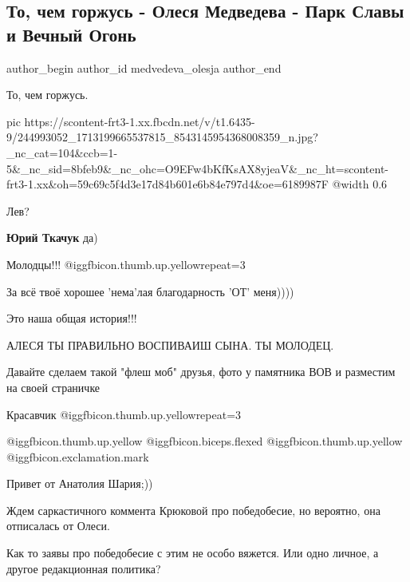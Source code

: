  
 
 
 
 
 
\subsection{То, чем горжусь - Олеся Медведева - Парк Славы и Вечный Огонь}
\label{sec:09_10_2021.fb.medvedeva_olesja.1.park_slavy}
 
\ifcmt
 author_begin
   author_id medvedeva_olesja
 author_end
\fi

То, чем горжусь.

\ifcmt
  pic https://scontent-frt3-1.xx.fbcdn.net/v/t1.6435-9/244993052_1713199665537815_8543145954368008359_n.jpg?_nc_cat=104&ccb=1-5&_nc_sid=8bfeb9&_nc_ohc=O9EFw4bKfKsAX8yjeaV&_nc_ht=scontent-frt3-1.xx&oh=59c69c5f4d3e17d84b601e6b84e797d4&oe=6189987F
  @width 0.6
\fi

\begin{itemize} %
Лев?

\textbf{Юрий Ткачук} да)

Молодцы!!! @igg{fbicon.thumb.up.yellow}{repeat=3} 

За всё твоё хорошее 'нема'лая благодарность 'ОТ' меня))))

Это наша общая история!!!

АЛЕСЯ ТЫ ПРАВИЛЬНО ВОСПИВАИШ СЫНА. ТЫ МОЛОДЕЦ.

Давайте сделаем такой "флеш моб" друзья, фото у памятника ВОВ и разместим на своей страничке

Красавчик  @igg{fbicon.thumb.up.yellow}{repeat=3} 

 @igg{fbicon.thumb.up.yellow}  @igg{fbicon.biceps.flexed}  @igg{fbicon.thumb.up.yellow} @igg{fbicon.exclamation.mark}

Привет от Анатолия Шария;))

Ждем саркастичного коммента Крюковой про победобесие, но вероятно, она отписалась от Олеси.

Как то заявы про победобесие с этим не особо вяжется. Или одно личное, а другое редакционная политика?
\end{itemize} %
